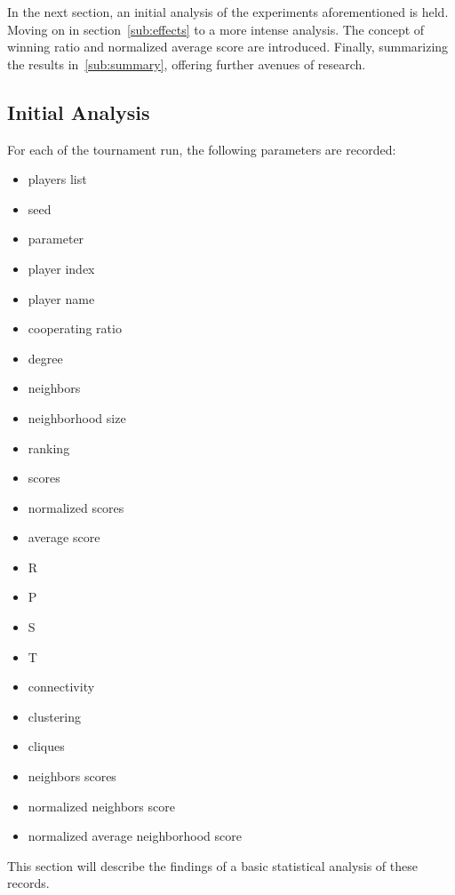 
In the next section, an initial analysis of the experiments aforementioned
is held. Moving on in section~\ref{sub:effects} to a more intense analysis. The
concept of winning ratio and normalized average score are introduced. Finally,
summarizing the results in~\ref{sub:summary}, offering further avenues  of research.


\subsection{Initial Analysis}

For each of the tournament run, the following parameters are recorded:

\begin{multicols}{3}
  \begin{itemize}
    \item players list
    \item seed
    \item parameter
    \item player index
    \item player name
    \item cooperating ratio
    \item degree
    \item neighbors
    \item neighborhood size
    \item ranking
    \item scores
    \item normalized scores
    \item average score
    \item R
    \item P
    \item S
    \item T
    \item connectivity
    \item clustering
    \item cliques
    \item neighbors scores
    \item normalized neighbors score
    \item normalized average neighborhood score
  \end{itemize}
\end{multicols}

This section will describe the findings of a basic statistical analysis of these
records.

